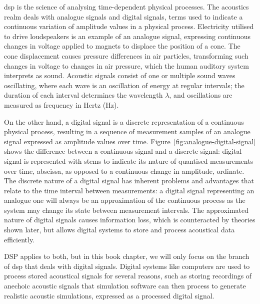 \acrfull{dsp} is the science of analysing time-dependent physical processes. The acoustics realm deals with analogue signals and digital signals, terms used to indicate a continuous variation of amplitude values in a physical process. Electricity utilised to drive loudspeakers is an example of an analogue signal, expressing continuous changes in voltage applied to magnets to displace the position of a cone. The cone displacement causes pressure differences in air particles, transforming such changes in voltage to changes in air pressure, which the human auditory system interprets as sound. Acoustic signals consist of one or multiple sound waves oscillating, where each wave is an oscillation of energy at regular intervals; the duration of each interval determines the wavelength $\lambda$, and oscillations are measured as frequency in Hertz (Hz). \par
On the other hand, a digital signal is a discrete representation of a continuous physical process, resulting in a sequence of measurement samples of an analogue signal expressed as amplitude values over time. Figure~\ref{fig:analogue-digital-signal} shows the difference between a continuous signal and a discrete signal: digital signal is represented with stems to indicate its nature of quantised measurements over time, abscissa, as opposed to a continuous change in amplitude, ordinate. The discrete nature of a digital signal has inherent problems and advantages that relate to the time interval between measurements: a digital signal representing an analogue one will always be an approximation of the continuous process as the system may change its state between measurement intervals. The approximated nature of digital signals causes information loss, which is counteracted by theories shown later, but allows digital systems to store and process acoustical data efficiently.\par
DSP applies to both, but in this book chapter, we will only focus on the branch of \acrshort{dsp} that deals with digital signals. Digital systems like computers are used to process stored acoustical signals for several reasons, such as storing recordings of anechoic acoustic signals that simulation software can then process to generate realistic acoustic simulations, expressed as a processed digital signal. \par
